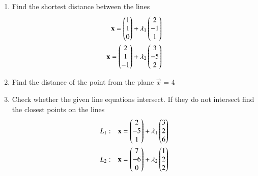 \renewcommand{\theequation}{\theenumi}
\begin{enumerate}[label=\thesection.\arabic*.,ref=\thesection.\theenumi]

  
\item Find the shortest distance between the lines
\begin{align}
\mathbf{x}=\begin{pmatrix}1\\1\\0\end{pmatrix}+\lambda_1\begin{pmatrix}2\\-1\\1\end{pmatrix}\\
\mathbf{x}=\begin{pmatrix}2\\1\\-1\end{pmatrix}+\lambda_2\begin{pmatrix}3\\-5\\2\end{pmatrix}
\end{align}
\solution

\item Find the distance of the point  from the plane $\vec{x}$ = 4
\\
\solution

%
\item  Check whether the given line equations intersect. If they do not  intersect find the closest points on the lines 
\begin{align}
L_1 & : & \mathbf{x}=\begin{pmatrix}2\\-5\\1\end{pmatrix}+\lambda_1\begin{pmatrix}3\\2\\6\end{pmatrix}\\
L_2 & : & \mathbf{x}=\begin{pmatrix}7\\-6\\0\end{pmatrix}+\lambda_2\begin{pmatrix}1\\2\\2\end{pmatrix}\end{align}
\\
\solution


\end{enumerate}
